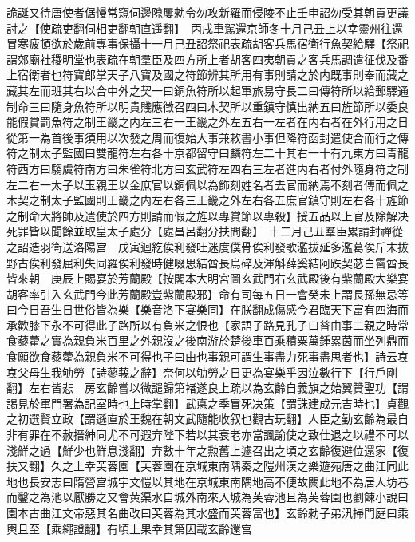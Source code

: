詭誕又待唐使者倨慢常窺伺邊隙屢勑令勿攻新羅而侵陵不止壬申詔勿受其朝貢更議討之【使疏吏翻伺相吏翻朝直遥翻】　丙戌車駕還京師冬十月己丑上以幸靈州往還冒寒疲頓欲於歲前專事保攝十一月己丑詔祭祀表疏胡客兵馬宿衛行魚契給驛【祭祀謂郊廟社稷明堂也表疏在朝羣臣及四方所上者胡客四夷朝貢之客兵馬調遣征伐及番上宿衛者也符寶郎掌天子八寶及國之符節辨其所用有事則請之於内既事則奉而藏之藏其左而班其右以合中外之契一曰銅魚符所以起軍旅易守長二曰傳符所以給郵驛通制命三曰隨身魚符所以明貴賤應徵召四曰木契所以重鎮守慎出納五曰旌節所以委良能假賞罰魚符之制王畿之内左三右一王畿之外左五右一左者在内右者在外行用之日從第一為首後事須用以次發之周而復始大事兼敕書小事但降符函封遣使合而行之傳符之制太子監國曰雙龍符左右各十京都留守曰麟符左二十其右一十有九東方曰青龍符西方曰騶虞符南方曰朱雀符北方曰玄武符左四右三左者進内右者付外隨身符之制左二右一太子以玉親王以金庶官以銅佩以為飾刻姓名者去官而納焉不刻者傳而佩之木契之制太子監國則王畿之内左右各三王畿之外左右各五庶官鎮守則左右各十旌節之制命大將帥及遣使於四方則請而假之旌以專賞節以專殺】授五品以上官及除解决死罪皆以聞餘並取皇太子處分【處昌呂翻分扶問翻】　十二月己丑羣臣累請封禪從之詔造羽衛送洛陽宫　戊寅迴紇俟利發吐迷度僕骨俟利發歌濫拔延多濫葛俟斤末拔野古俟利發屈利失同羅俟利發時健啜思結酋長烏碎及渾斛薛奚結阿跌契苾白霫酋長皆來朝　庚辰上賜宴於芳蘭殿【按閣本大明宮圖玄武門右玄武殿後有紫蘭殿大樂宴胡客率引入玄武門今此芳蘭殿豈紫蘭殿邪】命有司每五日一會癸未上謂長孫無忌等曰今日吾生日世俗皆為樂【樂音洛下宴樂同】在朕翻成傷感今君臨天下富有四海而承歡膝下永不可得此子路所以有負米之恨也【家語子路見孔子曰㫺由事二親之時常食藜藿之實為親負米百里之外親沒之後南游於楚後車百乘積粟萬鍾累茵而坐列鼎而食願欲食藜藿為親負米不可得也子曰由也事親可謂生事盡力死事盡思者也】詩云哀哀父母生我劬勞【詩蓼莪之辭】奈何以劬勞之日更為宴樂乎因泣數行下【行戶剛翻】左右皆悲　房玄齡嘗以微譴歸第褚遂良上疏以為玄齡自義旗之始翼贊聖功【謂謁見於軍門署為記室時也上時掌翻】武悳之季冒死决策【謂誅建成元吉時也】貞觀之初選賢立政【謂遜直於王魏在朝文武隨能收叙也觀古玩翻】人臣之勤玄齡為最自非有罪在不赦搢紳同尤不可遐弃陛下若以其衰老亦當諷諭使之致仕退之以禮不可以淺鮮之過【鮮少也鮮息淺翻】弃數十年之勲舊上遽召出之頃之玄齡復避位還家【復扶又翻】久之上幸芙蓉園【芙蓉園在京城東南隅秦之隑州漢之樂遊苑唐之曲江同此地也長安志曰隋營宫城宇文愷以其地在京城東南隅地高不便故闕此地不為居人坊巷而鑿之為池以厭勝之又會黄渠水自城外南來入城為芙蓉池且為芙蓉園也劉餗小說曰園本古曲江文帝惡其名曲改曰芙蓉為其水盛而芙蓉富也】玄齡勑子弟汛掃門庭曰乘輿且至【乘繩證翻】有頃上果幸其第因載玄齡還宫

